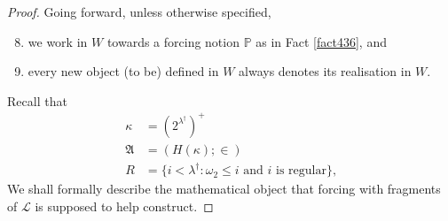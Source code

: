 \documentclass[12pt, twoside]{memoir}
\numberwithin{equation}{section}
\theoremstyle{definition}
\theoremstyle{remark}
\theoremstyle{definition}
\theoremstyle{definition}
\theoremstyle{definition}
\theoremstyle{remark}
\begin{document}
\begin{proof}
Going forward, unless otherwise specified, 
\begin{enumerate}[label=(\Alph*)]
    \setcounter{enumi}{7}
    \item we work in $W$ towards a forcing notion $\mathbb{P}$ as in Fact \ref{fact436}, and
    \item every new object (to be) defined in $W$ always denotes its realisation in $W$. 
\end{enumerate}
Recall that
\begin{align*}
    \kappa & = (2^{\lambda^{\dagger}})^+ \\
    \mathfrak{A} & = (H(\kappa); \in) \\
    R & = \{i < \lambda^{\dagger} : \omega_2 \leq i \text{ and } i \text{ is regular}\} \text{,}
\end{align*}
We shall formally describe the mathematical object that forcing with fragments of $\mathcal{L}$ is supposed to help construct. 


\end{proof}
\end{document}
